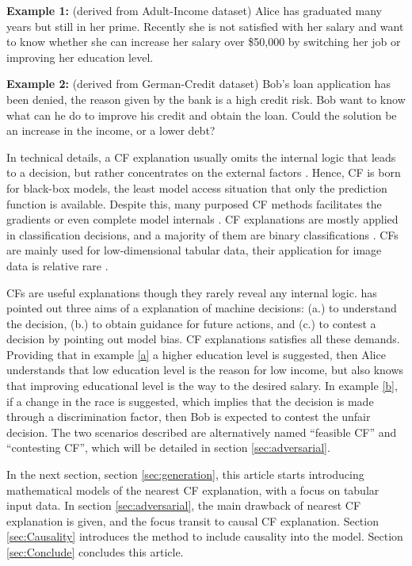 \noindent \textbf{Example 1:} \label{a}(derived from Adult-Income dataset) Alice has graduated many years but still in her prime. Recently she is not satisfied with her salary and want to know whether she can increase her salary over \$50,000 by switching her job or improving her education level.

\noindent \textbf{Example 2:} \label{b}(derived from German-Credit dataset) Bob's loan application has been denied, the reason given by the bank is a high credit risk. Bob want to know what can he do to improve his credit and obtain the loan. Could the solution be an increase in the income, or a lower debt?

In technical details, a CF explanation usually omits the internal logic that leads to a decision, but rather concentrates on the external factors \cite{watcher2017}. Hence, CF is born for black-box models, the least model access situation that only the prediction function is available. Despite this, many purposed CF methods facilitates the gradients or even complete model internals \cite{CFReview}. CF explanations are mostly applied in classification decisions, and a majority of them are binary classifications \cite{CFandAE}. CFs are mainly used for low-dimensional tabular data, their application for image data is relative rare \cite{CFandAE}.

CFs are useful explanations though they rarely reveal any internal logic. \citeauthor{watcher2017} \cite{watcher2017} has pointed out three aims of a explanation of machine decisions: (a.) to understand the decision, (b.) to obtain guidance for future actions, and (c.) to contest a decision by pointing out model bias. CF explanations satisfies all these demands. Providing that in example \ref{a} a higher education level is suggested, then Alice understands that low education level is the reason for low income, but also knows that improving educational level is the way to the desired salary. In example \ref{b}, if a change in the race is suggested, which implies that the decision is made through a discrimination factor, then Bob is expected to contest the unfair decision. The two scenarios described are alternatively named ``feasible CF'' and ``contesting CF'', which will be detailed in section \ref{sec:adversarial}.

In the next section, section \ref{sec:generation}, this article starts introducing mathematical models of the nearest CF explanation, with a focus on tabular input data. In section \ref{sec:adversarial}, the main drawback of nearest CF explanation is given, and the focus transit to causal CF explanation. Section \ref{sec:Causality} introduces the method to include causality into the model. Section \ref{sec:Conclude} concludes this article.

